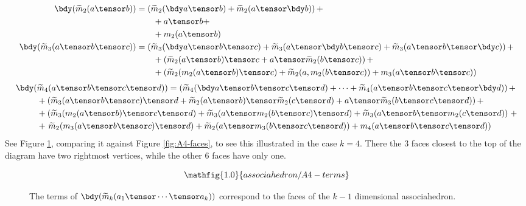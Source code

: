 \documentclass[11pt,leqno]{amsart}
\begin{document}
\begin{align*}
\bdy(\tm_2(a \tensor b)) & = \left(\tm_2(\bdy a \tensor b) + \tm_2(a \tensor \bdy b)\right) + \\
                         & \qquad + a \tensor b + \\
                         & \qquad + m_2(a \tensor b) \\
\bdy(\tm_3(a \tensor b \tensor c)) & = \left(\tm_3(\bdy a \tensor b \tensor c) + \tm_3(a \tensor \bdy b \tensor c) + \tm_3(a \tensor b \tensor \bdy c)\right) + \\
                                   & \qquad + \left(\tm_2(a \tensor b) \tensor c + a \tensor \tm_2(b \tensor c)\right) + \\
                                   & \qquad + \left(\tm_2(m_2(a \tensor b) \tensor c) + \tm_2(a, m_2(b \tensor c)) + m_3(a \tensor b \tensor c)\right)
\end{align*}
\begin{align*}
\bdy(& \tm_4(a \tensor b \tensor c \tensor d)) = \left(\tm_4(\bdy a \tensor b \tensor c \tensor d) + \cdots + \tm_4(a \tensor b \tensor c \tensor \bdy d)\right) + \\
                                             & + \left(\tm_3(a \tensor b \tensor c) \tensor d + \tm_2(a \tensor b) \tensor \tm_2(c \tensor d) + a \tensor \tm_3(b \tensor c \tensor d)\right) + \\
                                             & + \left(\tm_3(m_2(a \tensor b) \tensor c \tensor d) + \tm_3(a \tensor m_2(b \tensor c) \tensor d) + \tm_3(a \tensor b \tensor m_2(c \tensor d))\right. + \\
                                             & + \left.\tm_2(m_3(a \tensor b \tensor c) \tensor d) + \tm_2(a \tensor m_3(b \tensor c \tensor d)) + m_4(a \tensor b \tensor c \tensor d)\right) \\
\end{align*}
See Figure \ref{fig:A4-terms}, comparing it against Figure \ref{fig:A4-faces}, to see this illustrated in the case $k=4$. There the $3$ faces closest
to the top of the diagram have two rightmost vertices, while the other $6$ faces have only one.

\begin{figure}[!ht]
\begin{equation*}
\mathfig{1.0}{associahedron/A4-terms}
\end{equation*}
\caption{The terms of $\bdy(\tm_k(a_1 \tensor \cdots \tensor a_k))$ correspond to the faces of the $k-1$ dimensional associahedron.}
\label{fig:A4-terms}
\end{figure}
\end{document}
